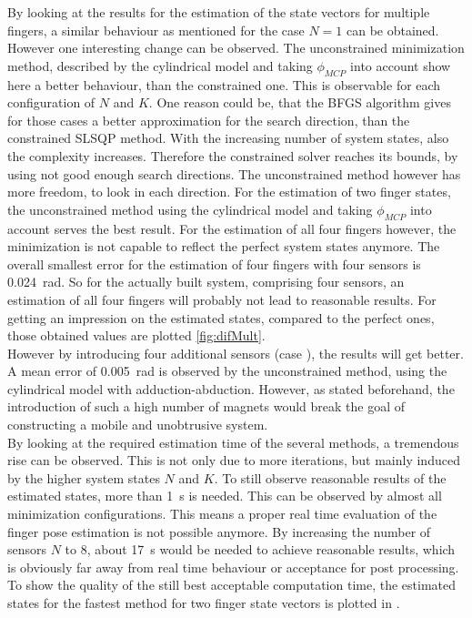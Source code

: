 By looking at the results for the estimation of the state vectors for multiple fingers, a similar behaviour as mentioned for the case $ N = 1 $ can be obtained. However one interesting change can be observed. The unconstrained minimization method, described by the cylindrical model and taking $ \phi_{MCP} $ into account show here a better behaviour, than the constrained one. This is observable for each configuration of $ N $ and $ K $. One reason could be, that the \ac{BFGS} algorithm gives for those cases a better approximation for the search direction, than the constrained \ac{SLSQP} method. With the increasing number of system states, also the complexity increases. Therefore the constrained solver reaches its bounds, by using not good enough search directions. The unconstrained method however has more freedom, to look in each direction. For the estimation of two finger states, the unconstrained method using the cylindrical model and taking $ \phi_{MCP} $ into account serves the best result. For the estimation of all four fingers however, the minimization is not capable to reflect the perfect system states anymore. The overall smallest error for the estimation of four fingers with four sensors is \SI{0.024}{\radian}. So for the actually built system, comprising four sensors, an estimation of all four fingers will probably not lead to reasonable results. For getting an impression on the estimated states, compared to the perfect ones, those obtained values are plotted \ref{fig:difMult}. \\
However by introducing four additional sensors (case  \grqq), the results will get better. A mean error of \SI{0.005}{\radian} is observed by the unconstrained method, using the cylindrical model with adduction-abduction. However, as stated beforehand, the introduction of such a high number of magnets would break the goal of constructing a mobile and unobtrusive system. \\
By looking at the required estimation time of the several methods, a tremendous rise can be observed. This is not only due to more iterations, but mainly induced by the higher system states $ N $ and $ K $. To still observe reasonable results of the estimated states, more than \SI{1}{\second} is needed. This can be observed by almost all minimization configurations. This means a proper real time evaluation of the finger pose estimation is not possible anymore. By increasing the number of sensors $ N $ to 8, about \SI{17}{\second} would be needed to achieve reasonable results, which is obviously far away from real time behaviour or acceptance for post processing. To show the quality of the still best acceptable computation time, the estimated states for the fastest method for two finger state vectors is plotted in  . \\

